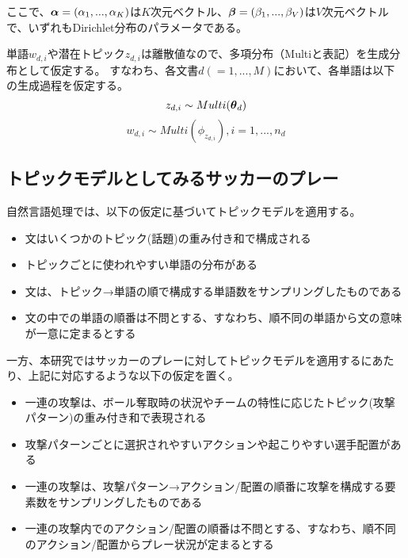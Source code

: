 ここで、$\mbox{\boldmath $\alpha$}=(\alpha_1,...,\alpha_K)$は$K$次元ベクトル、$\mbox{\boldmath $\beta$}=(\beta_1,...,\beta_V)$は$V$次元ベクトルで、いずれもDirichlet分布のパラメータである。

単語$w_{d,i}$や潜在トピック$z_{d,i}$は離散値なので、多項分布（Multiと表記）を生成分布として仮定する。
すなわち、各文書$d(=1,...,M)$において、各単語は以下の生成過程を仮定する。
\begin{equation}
	z_{d,i} \sim Multi(\mbox{\boldmath $\theta$}_d)
\end{equation}
\begin{equation}
	w_{d,i} \sim Multi(\phi_{z_{d,i}}) ,i=1,...,n_d
\end{equation}




\subsection{トピックモデルとしてみるサッカーのプレー}
自然言語処理では、以下の仮定に基づいてトピックモデルを適用する。
\begin{itemize}
	\setlength{\itemsep}{0cm} %
	\item 文はいくつかのトピック(話題)の重み付き和で構成される
	\item トピックごとに使われやすい単語の分布がある
	\item 文は、トピック→単語の順で構成する単語数をサンプリングしたものである
	\item 文の中での単語の順番は不問とする、すなわち、順不同の単語から文の意味が一意に定まるとする
\end{itemize}

一方、本研究ではサッカーのプレーに対してトピックモデルを適用するにあたり、上記に対応するような以下の仮定を置く。
\begin{itemize}
	\setlength{\itemsep}{0cm} %
	\item 一連の攻撃は、ボール奪取時の状況やチームの特性に応じたトピック(攻撃パターン)の重み付き和で表現される
	\item 攻撃パターンごとに選択されやすいアクションや起こりやすい選手配置がある
	\item 一連の攻撃は、攻撃パターン→アクション/配置の順番に攻撃を構成する要素数をサンプリングしたものである
	\item 一連の攻撃内でのアクション/配置の順番は不問とする、すなわち、順不同のアクション/配置からプレー状況が定まるとする
\end{itemize}

